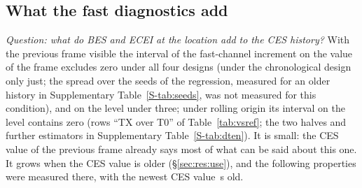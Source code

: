 \documentclass[11pt,a4paper]{article}
\newcommand{\SuppTab}[1]{Supplementary Table~\ref{S-#1}}
\begin{document}
\subsection{What the fast diagnostics add}
\label{sec:res:fast}

\emph{Question: what do BES and ECEI at the location add to the CES history?} With the previous frame visible the interval of the fast-channel increment on the value of the frame excludes zero under all four designs (under the chronological design only just; the spread over the seeds of the regression, measured for an older history in \SuppTab{tab:seeds}, was not measured for this condition), and on the level under three; under rolling origin its interval on the level contains zero (rows ``TX over T0'' of Table~\ref{tab:vsref}; the two halves and further estimators in \SuppTab{tab:dten}). It is small: the CES value of the previous frame already says most of what can be said about this one. It grows when the CES value is older (\S\ref{sec:res:use}), and the following properties were measured there, with the newest CES value \AgeMedianS\,s old.
\end{document}
